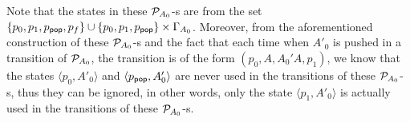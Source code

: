 Note that the states in these ${\mathcal{P} }_{A_0}$-{\NFA}s are from the set $\{p_0, p_1, p_{\mathsf{pop}}, p_f\} \cup \{p_0, p_1, p_{\mathsf{pop}}\} \times \Gamma_{A_0}$.
Moreover, from the aforementioned construction of these ${\mathcal{P} }_{A_0}$-{\NFA}s and the fact that each time when $A'_0$ is pushed in a transition of ${\mathcal{P} }_{A_0}$, the transition is of the form $(p_0, A, A_0'A, p_1)$, we know that the states $\langle p_0, A'_0\rangle$ and $\langle p_{\mathsf{pop}}, A'_0\rangle$ are never used in the transitions of these ${\mathcal{P} }_{A_0}$-{\NFA}s, thus they can be ignored, in other words, only the state $\langle p_1, A'_0\rangle$ is actually used in the transitions of these ${\mathcal{P} }_{A_0}$-{\NFA}s. 





